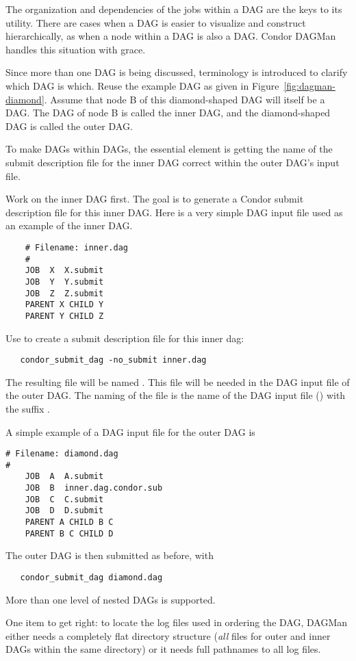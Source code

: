 The organization and dependencies of the jobs within a DAG
are the keys to its utility.
There are cases when a DAG is easier to visualize and 
construct hierarchically,
as when a node within a DAG is also a DAG.
Condor DAGMan handles this situation with grace.

Since more than one DAG is being discussed, 
terminology is introduced to clarify which DAG is which. 
Reuse the example DAG as given in 
Figure~\ref{fig:dagman-diamond}.
Assume that node B of this diamond-shaped DAG
will itself be a DAG.
The DAG of node B is called the inner DAG,
and the diamond-shaped DAG is called the outer DAG.

To make DAGs within DAGs,
the essential element is getting the name of the submit description
file for the inner DAG correct within the outer DAG's input
file.

Work on the inner DAG first.
The goal is to generate a Condor submit description file for this inner DAG.
Here is a very simple DAG input file used as an example of the inner DAG.
\begin{verbatim}
    # Filename: inner.dag
    #
    JOB  X  X.submit
    JOB  Y  Y.submit
    JOB  Z  Z.submit
    PARENT X CHILD Y
    PARENT Y CHILD Z
\end{verbatim}

Use  to create a submit description file for this
inner dag:
\begin{verbatim}
   condor_submit_dag -no_submit inner.dag
\end{verbatim}
The resulting file will be named .
This file will be needed in the DAG input file of the outer DAG.
The naming of the file is the name of the DAG input file
() with the suffix .

A simple example of a DAG input file for the outer DAG is
\begin{verbatim}
# Filename: diamond.dag
#
    JOB  A  A.submit 
    JOB  B  inner.dag.condor.sub
    JOB  C  C.submit	
    JOB  D  D.submit
    PARENT A CHILD B C
    PARENT B C CHILD D
\end{verbatim}

The outer DAG is then submitted as before, with
\begin{verbatim}
   condor_submit_dag diamond.dag
\end{verbatim}

More than one level of nested DAGs is supported.

One item to get right:
to locate the log files used in ordering the DAG,
DAGMan either needs a completely flat directory structure
(\emph{all} files for outer and inner DAGs within the same directory)
or
it needs full pathnames to all log files.

